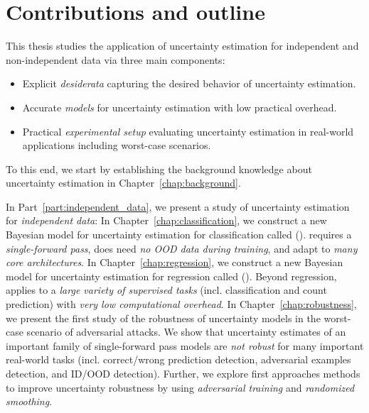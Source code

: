 \section{Contributions and outline}

This thesis studies the application of uncertainty estimation for independent and non-independent data via three main components:
\begin{itemize}
    \item Explicit \emph{desiderata} capturing the desired behavior of uncertainty estimation.
    \item Accurate \emph{models} for uncertainty estimation with low practical overhead.
    \item Practical \emph{experimental setup} evaluating uncertainty estimation in real-world applications including worst-case scenarios.
\end{itemize} 

To this end, we start by establishing the background knowledge about uncertainty estimation in Chapter~\ref{chap:background}.

In Part~\ref{part:independent_data}, we present a study of uncertainty estimation for \emph{independent data}: 
In Chapter~\ref{chap:classification}, we construct a new Bayesian model for uncertainty estimation for classification called \PostNet{} (\PostNetacro{}). \PostNetacro{} requires a \emph{single-forward pass}, does need \emph{no OOD data during training}, and adapt to \emph{many core architectures}.
In Chapter~\ref{chap:regression}, we construct a new Bayesian model for uncertainty estimation for regression called \NatPN{} (\NatPNacro{}). Beyond regression, \NatPNacro{} applies to a \emph{large variety of supervised tasks} (incl. classification and count prediction) with \emph{very low computational overhead}.
In Chapter~\ref{chap:robustness}, we present the first study of the robustness of uncertainty models in the worst-case scenario of adversarial attacks. We show that uncertainty estimates of an important family of single-forward pass models are \emph{not robust} for many important real-world tasks (incl. correct/wrong prediction detection, adversarial examples detection, and ID/OOD detection). Further, we explore first approaches methods to improve uncertainty robustness by using \emph{adversarial training} and \emph{randomized smoothing}. 

